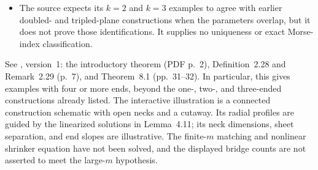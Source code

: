 \begin{example}
\begin{itemize}
\item The source expects its $k=2$ and $k=3$ examples to agree with earlier doubled- and tripled-plane constructions when the parameters overlap, but it does not prove those identifications. It supplies no uniqueness or exact Morse-index classification.
\end{itemize}
See \cite{CatShaoZou2025}, version~1: the introductory theorem (PDF p.~2), Definition~2.28 and Remark~2.29 (p.~7), and Theorem~8.1 (pp.~31--32). In particular, this gives examples with four or more ends, beyond the one-, two-, and three-ended constructions already listed. The interactive illustration is a connected construction schematic with open necks and a cutaway. Its radial profiles are guided by the linearized solutions in Lemma~4.11; its neck dimensions, sheet separation, and end slopes are illustrative. The finite-$m$ matching and nonlinear shrinker equation have not been solved, and the displayed bridge counts are not asserted to meet the large-$m$ hypothesis.
\end{example}

